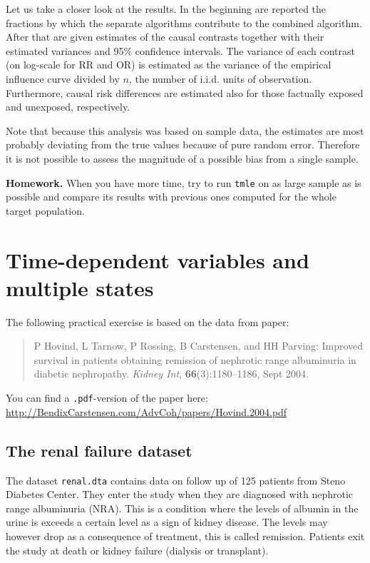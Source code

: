 \documentclass[
]{book}
\begin{document}
Let us take a closer look at the results. In the beginning are reported
the fractions by which the separate algorithms contribute to the
combined algorithm. After that are given estimates
of the causal contrasts
together with their estimated variances and 95\% confidence intervals.
The variance of each contrast (on log-scale for RR and OR)
is estimated as the variance of the empirical influence curve
divided by \(n\), the number of i.i.d. units of observation.
Furthermore, causal risk differences are estimated
also for those factually exposed and unexposed, respectively.

Note that because this analysis was based on sample data, the
estimates are most probably deviating from the true values because
of pure random error.
Therefore it is not possible to assess the magnitude
of a possible bias from a single sample.

\textbf{Homework.}
When you have more time, try to run \texttt{tmle}
on as large sample as is possible and compare
its results with previous ones computed for the whole target population.

\chapter{Time-dependent variables and multiple states}\label{time-dependent-variables-and-multiple-states}

The following practical exercise is based on the data from paper:

\begin{quote}
P Hovind, L Tarnow, P Rossing, B Carstensen, and HH Parving:
Improved survival in patients obtaining remission of nephrotic range
albuminuria in diabetic nephropathy.
\emph{Kidney Int}, \textbf{66}(3):1180--1186, Sept 2004.
\end{quote}

You can find a \texttt{.pdf}-version of the paper here:
\url{http://BendixCarstensen.com/AdvCoh/papers/Hovind.2004.pdf}

\section{The renal failure dataset}\label{the-renal-failure-dataset}

The dataset \texttt{renal.dta} contains data on follow up of 125
patients from Steno Diabetes Center. They enter the study when they
are diagnosed with nephrotic range albuminuria (NRA). This is a
condition where the levels of albumin in the urine is exceeds a
certain level as a sign of kidney disease. The levels may however drop
as a consequence of treatment, this is called remission. Patients exit
the study at death or kidney failure (dialysis or transplant).
\end{document}
